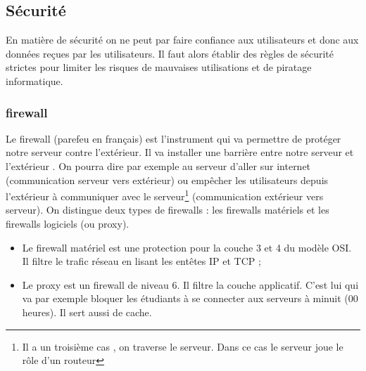 \documentclass[a4paper,12pt,french]{report} %
\begin{document}
\subsection{Sécurité}
En matière de sécurité on ne peut par faire confiance aux utilisateurs et donc aux données reçues par les utilisateurs. Il faut alors établir des règles de sécurité strictes pour limiter les risques de mauvaises utilisations et de piratage informatique.
\subsubsection{firewall}
Le firewall (parefeu en français) est l'instrument qui va permettre de protéger notre serveur contre l'extérieur. Il va installer une barrière entre notre serveur et l'extérieur . On pourra dire par exemple au serveur d'aller sur internet (communication serveur vers extérieur) ou empêcher les utilisateurs depuis l'extérieur à communiquer avec le serveur\footnote{Il a un troisième cas , on traverse le serveur. Dans ce cas le serveur joue le rôle d'un routeur} (communication extérieur vers serveur). On distingue deux types de firewalls : les firewalls matériels et les firewalls logiciels (ou proxy).
\begin{itemize}
\item Le firewall matériel est une protection pour la couche 3 et 4 du modèle OSI. Il filtre le trafic réseau en lisant les entêtes IP et TCP ;
\item Le proxy est un firewall de niveau 6. Il filtre la couche applicatif. C'est lui qui va par exemple bloquer les étudiants à se connecter aux serveurs à minuit (00 heures). Il sert aussi de cache.
\end{itemize}
\end{document}
